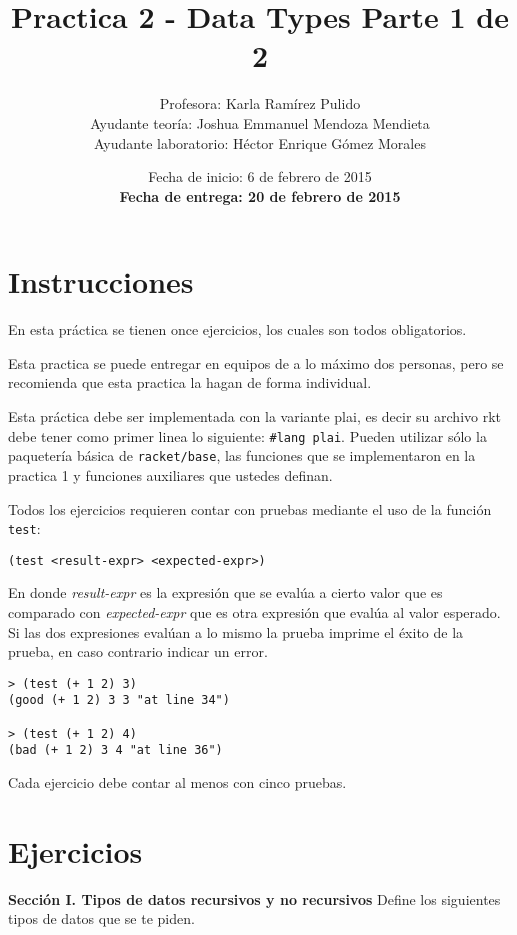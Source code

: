 \documentclass{article}
\author{Profesora: Karla Ramírez Pulido\\
  Ayudante teoría: Joshua Emmanuel Mendoza Mendieta\\
  Ayudante laboratorio: Héctor Enrique Gómez Morales}
\title{Practica 2 - Data Types Parte 1 de 2}
\date{Fecha de inicio: 6 de febrero de 2015\\
  \textbf{Fecha de entrega: 20 de febrero de 2015}}
\begin{document}
\maketitle
\section{Instrucciones}
En esta práctica se tienen once ejercicios, los cuales son todos obligatorios.

Esta practica se puede entregar en equipos de a lo máximo dos
personas, pero se recomienda que esta practica la hagan de forma
individual.

Esta práctica debe ser implementada con la variante plai, es decir
su archivo rkt debe tener como primer linea lo siguiente:
\texttt{\#lang plai}. Pueden utilizar sólo la paquetería básica de
\texttt{racket/base}, las funciones que se implementaron en la
practica 1 y funciones auxiliares que ustedes definan.

Todos los ejercicios requieren contar con pruebas mediante el uso de
la función \texttt{test}:
\begin{verbatim}
(test <result-expr> <expected-expr>)
\end{verbatim}

En donde \textit{result-expr} es la expresión que se evalúa a cierto
valor que es comparado con \textit{expected-expr} que es otra
expresión que evalúa al valor esperado. Si las dos expresiones evalúan
a lo mismo la prueba imprime el éxito de la prueba, en caso contrario
indicar un error.

\begin{verbatim}
> (test (+ 1 2) 3)
(good (+ 1 2) 3 3 "at line 34")

> (test (+ 1 2) 4)
(bad (+ 1 2) 3 4 "at line 36")
\end{verbatim}

Cada ejercicio debe contar al menos con cinco pruebas.

\section{Ejercicios}
\textbf{Sección I. Tipos de datos recursivos y no recursivos} Define
los siguientes tipos de datos que se te piden.
\end{document}
